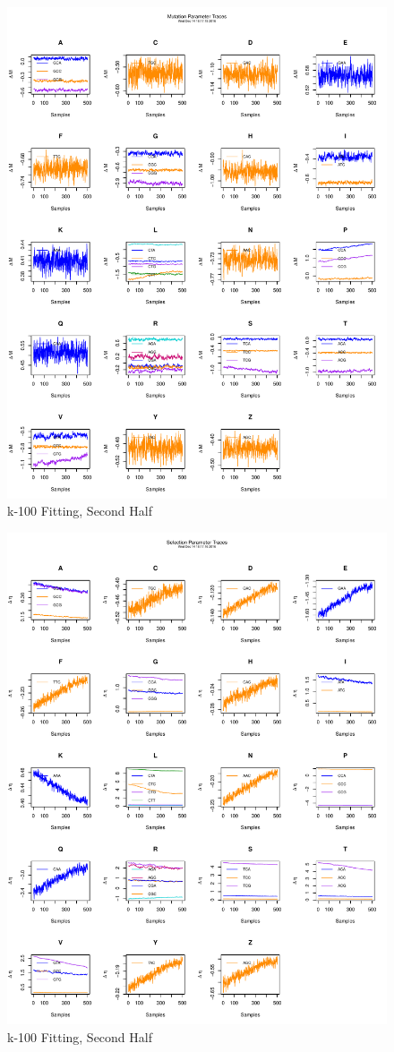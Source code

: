 \documentclass[11pt]{labbook}
\begin{document}
    \begin{figure}
        \centering
        \includegraphics[scale=.65]{FONSE_Plots/2016/December_14/k-100_mutation_final}
        \caption{k-100 Fitting, Second Half}
        \label{fig:k-100_2MUT}
    \end{figure}
    \begin{figure}
        \centering
        \includegraphics[scale=.65]{FONSE_Plots/2016/December_14/k-100_selection_final}
        \caption{k-100 Fitting, Second Half}
        \label{fig:k-100_2SEL}
    \end{figure}
    
\end{document}
